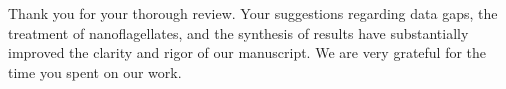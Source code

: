 \documentclass[12pt,english]{reviewresponse}
\begin{document}
\begin{concludingresponse}[]
	Thank you for your thorough review. Your suggestions regarding data gaps, the treatment of nanoflagellates, and the synthesis of results have substantially improved the clarity and rigor of our manuscript. We are very grateful for the time you spent on our work.
\end{concludingresponse}


	
	
	


	
	
	
\printbibliography{}
\end{document}
